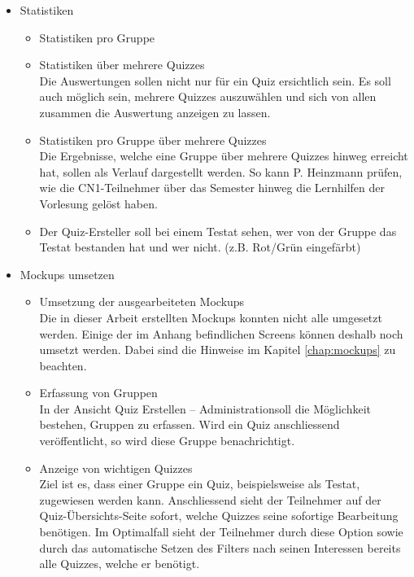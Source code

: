 \begin{itemize}
	
	\item Statistiken
	\begin{itemize}
		\item Statistiken pro Gruppe
		\item Statistiken über mehrere Quizzes \\
		Die Auswertungen sollen nicht nur für ein Quiz ersichtlich sein. Es soll auch möglich sein, mehrere Quizzes auszuwählen und sich von allen zusammen die Auswertung anzeigen zu lassen.
		\item Statistiken pro Gruppe über mehrere Quizzes \\
		Die Ergebnisse, welche eine Gruppe über mehrere Quizzes hinweg erreicht hat, sollen als Verlauf dargestellt werden. So kann P. Heinzmann prüfen, wie die CN1-Teilnehmer über das Semester hinweg die Lernhilfen der Vorlesung gelöst haben.
		\item Der Quiz-Ersteller soll bei einem Testat sehen, wer von der Gruppe das Testat bestanden hat und wer nicht. (z.B. Rot/Grün eingefärbt)
	\end{itemize}
	
	
	\item Mockups umsetzen \\
	\begin{itemize}
		\item Umsetzung der ausgearbeiteten Mockups\\
		Die in dieser Arbeit erstellten Mockups konnten nicht alle umgesetzt werden. Einige der im Anhang befindlichen Screens können deshalb noch umsetzt werden. Dabei sind die Hinweise im Kapitel \ref{chap:mockups} zu beachten.
		
		\item Erfassung von Gruppen \\
		In der Ansicht \glqq Quiz Erstellen – Administration\grqq soll die Möglichkeit bestehen, Gruppen zu erfassen. Wird ein Quiz anschliessend veröffentlicht, so wird diese Gruppe benachrichtigt.
		
		\item Anzeige von wichtigen Quizzes \\
		Ziel ist es, dass einer Gruppe ein Quiz, beispielsweise als Testat, zugewiesen werden kann. Anschliessend sieht der Teilnehmer auf der Quiz-Übersichts-Seite sofort, welche Quizzes seine sofortige Bearbeitung benötigen.
		Im Optimalfall sieht der Teilnehmer durch diese Option sowie durch das automatische Setzen des Filters nach seinen Interessen bereits alle Quizzes, welche er benötigt.
		

\end{itemize}
\end{itemize}
